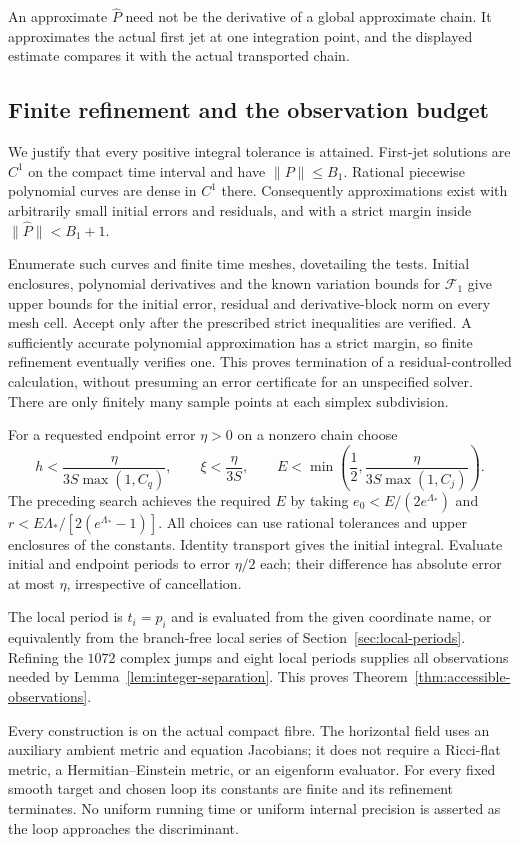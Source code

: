 An approximate $\widehat P$ need not be the derivative of a
global approximate chain. It approximates the actual first jet
at one integration point, and the displayed estimate compares it
with the actual transported chain.

\subsection{Finite refinement and the observation budget}

We justify that every positive integral tolerance is attained.
First-jet solutions are $C^1$ on the compact time interval and
have $\|P\|\le B_1$. Rational piecewise polynomial curves are
dense in $C^1$ there. Consequently approximations exist with
arbitrarily small initial errors and residuals, and with a strict
margin inside $\|\widehat P\|<B_1+1$.

Enumerate such curves and finite time meshes, dovetailing the
tests. Initial enclosures, polynomial derivatives and the known
variation bounds for $\mathcal F_1$ give upper bounds for the
initial error, residual and derivative-block norm on every mesh
cell. Accept only after the prescribed strict inequalities are
verified. A sufficiently accurate polynomial approximation has
a strict margin, so finite refinement eventually verifies one.
This proves termination of a residual-controlled calculation,
without presuming an error certificate for an unspecified solver.
There are only finitely many sample points at each simplex
subdivision.

For a requested endpoint error $\eta>0$ on a nonzero chain choose
\[
 h<\frac{\eta}{3S\max(1,C_q)},\qquad
 \xi<\frac{\eta}{3S},\qquad
 E<\min\left(\frac12,\frac{\eta}{3S\max(1,C_j)}\right).
\]
The preceding search achieves the required $E$ by taking
$e_0<E/(2e^{\Lambda_*})$ and
$r<E\Lambda_*/[2(e^{\Lambda_*}-1)]$.
All choices can use rational tolerances and upper enclosures of
the constants. Identity transport gives the initial integral.
Evaluate initial and endpoint periods to error $\eta/2$ each;
their difference has absolute error at most $\eta$, irrespective
of cancellation.

The local period is $t_i=p_i$ and is evaluated from the given
coordinate name, or equivalently from the branch-free local
series of Section~\ref{sec:local-periods}. Refining the $1072$
complex jumps and eight local periods supplies all observations
needed by Lemma~\ref{lem:integer-separation}. This proves
Theorem~\ref{thm:accessible-observations}.

Every construction is on the actual compact fibre. The horizontal
field uses an auxiliary ambient metric and equation Jacobians;
it does not require a Ricci-flat metric, a Hermitian--Einstein
metric, or an eigenform evaluator. For every fixed smooth target
and chosen loop its constants are finite and its refinement
terminates. No uniform running time or uniform internal precision
is asserted as the loop approaches the discriminant.
